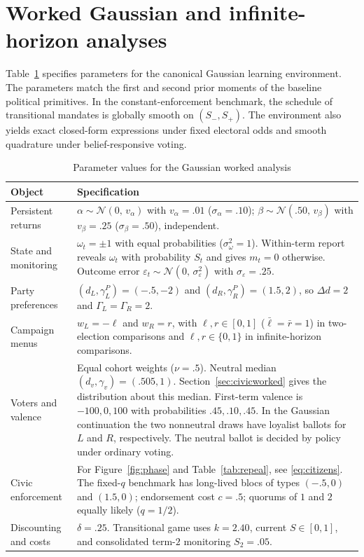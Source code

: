 \documentclass[11pt,letterpaper]{article}
\newcommand{\Dd}{\Delta d}
\begin{document}
\section{Worked Gaussian and infinite-horizon analyses}\label{sec:example}

Table~\ref{tab:params} specifies parameters for the canonical Gaussian learning environment. The parameters match the first and second prior moments of the baseline political primitives. In the constant-enforcement benchmark, the schedule of transitional mandates is globally smooth on $(S_-,S_+)$. The environment also yields exact closed-form expressions under fixed electoral odds and smooth quadrature under belief-responsive voting.

\begin{table}[htbp]\centering\small
\caption{Parameter values for the Gaussian worked analysis}\label{tab:params}
\begin{tabular}{@{}p{.27\linewidth}p{.66\linewidth}@{}}
\toprule
Object & Specification\\ \midrule
Persistent returns & $\alpha\sim\mathcal N(0,\,v_\alpha)$ with $v_\alpha=.01$ ($\sigma_\alpha=.10$); $\beta\sim\mathcal N(.50,\,v_\beta)$ with $v_\beta=.25$ ($\sigma_\beta=.50$), independent.\\
State and monitoring & $\omega_t=\pm 1$ with equal probabilities ($\sigma_\omega^2=1$). Within-term report reveals $\omega_t$ with probability $S_t$ and gives $m_t=0$ otherwise. Outcome error $\varepsilon_t\sim\mathcal N(0,\,\sigma_\varepsilon^2)$ with $\sigma_\varepsilon=.25$.\\
Party preferences & $(d_L,\gamma_L^P)=(-.5,-2)$ and $(d_R,\gamma_R^P)=(1.5,2)$, so $\Dd=2$ and $\Gamma_L=\Gamma_R=2$.\\
Campaign menus & $w_L=-\ell$ and $w_R=r$, with $\ell,r\in[0,1]$ ($\bar\ell=\bar r=1$) in two-election comparisons and $\ell,r\in\{0,1\}$ in infinite-horizon comparisons.\\
Voters and valence & Equal cohort weights ($\nu=.5$). Neutral median $(d_v,\gamma_v)=(.505,1)$. Section~\ref{sec:civicworked} gives the distribution about this median. First-term valence is $-100,0,100$ with probabilities $.45,.10,.45$. In the Gaussian continuation the two nonneutral draws have loyalist ballots for $L$ and $R$, respectively. The neutral ballot is decided by policy under ordinary voting.\\
Civic enforcement & For Figure~\ref{fig:phase} and Table~\ref{tab:repeal}, see \eqref{eq:citizens}. The fixed-$q$ benchmark has long-lived blocs of types $(-.5,0)$ and $(1.5,0)$; endorsement cost $c=.5$; quorums of $1$ and $2$ equally likely ($q=1/2$).\\
Discounting and costs & $\delta=.25$. Transitional game uses $k=2.40$, current $S\in[0,1]$, and consolidated term-$2$ monitoring $S_2=.05$.\\
\bottomrule
\end{tabular}
\end{table}
\end{document}
